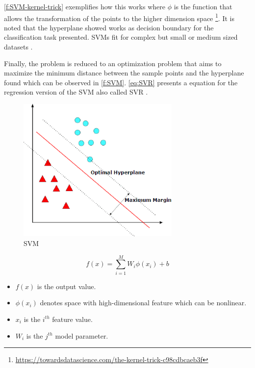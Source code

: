 \autoref{f:SVM-kernel-trick} exemplifies how this works where \begin{math}\phi\end{math} is the function that allows the transformation of the points to the higher dimension space \footnote{\url{https://towardsdatascience.com/the-kernel-trick-c98cdbcaeb3f}}. It is noted that the hyperplane showed works as decision boundary for the classification task presented. \ac{SVM}s fit for complex but small or medium sized datasets \cite{geron2017}.
 
Finally, the problem is reduced to an optimization problem that aims to maximize the minimum distance between the sample points and the hyperplane found which can be observed in \autoref{f:SVM}. \autoref{eq:SVR} presents a equation for the regression version of the \ac{SVM} also called \ac{SVR} \cite{Ye2020}. 

\begin{figure}[h]
\centering
\includegraphics[width=8cm]{figures/Ch2/SVM.png}
\caption{SVM \cite{Hussain2011}}
\label{f:SVM}
\end{figure}

\begin{equation}\label{eq:SVR}
    f(x) = \sum_{i=1}^{M} W_i \phi(x_i) + b
\end{equation}

\begin{itemize}
    \item \begin{math}f(x)\end{math} is the output value.
    \item \begin{math}\phi(x_i)\end{math} denotes space with high-dimensional feature which can be nonlinear.
    \item \begin{math}x_i\end{math} is the \begin{math}i^{th}\end{math} feature value.
    \item \begin{math}W_i\end{math} is the \begin{math}j^{th}\end{math} model parameter.
\end{itemize}

